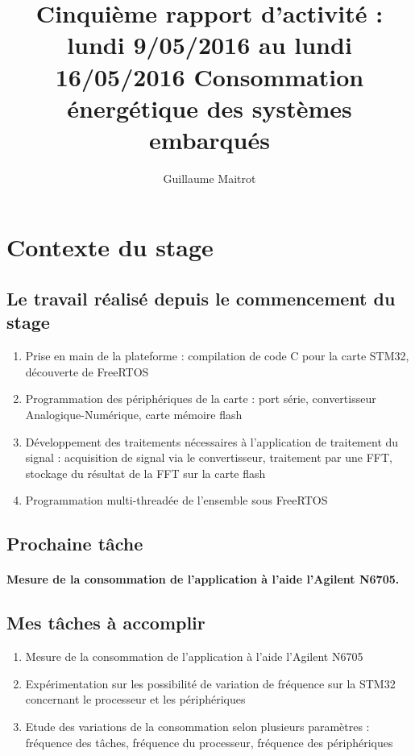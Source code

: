 \documentclass[a4paper]{article}
\title{Cinquième rapport d'activité : lundi 9/05/2016 au lundi 16/05/2016 }
\author{Guillaume Maitrot}
\begin{document}
\maketitle

\begin{center}
\centering
\title{Consommation énergétique des systèmes embarqués}
\end{center}

\section{Contexte du stage}

 \subsection{Le travail réalisé depuis le commencement du stage}
 \begin{enumerate}
\item {Prise en main de la plateforme : compilation de code C pour la carte STM32, découverte de FreeRTOS}
\item {Programmation des périphériques de la carte : port série,
convertisseur Analogique-Numérique, carte mémoire flash}
\item {Développement des traitements nécessaires à l'application de
traitement du signal : acquisition de signal via le convertisseur,
traitement par une FFT, stockage du résultat de la FFT sur la carte
flash}
\item { Programmation multi-threadée de l'ensemble sous FreeRTOS}
\end{enumerate}

 \subsection{Prochaine tâche}
    \paragraph{Mesure de la consommation de l'application à l'aide l'Agilent
N6705.}
    
\subsection{Mes tâches à accomplir}
\begin{enumerate}
\item {Mesure de la consommation de l'application à l'aide l'Agilent
N6705}
\item {Expérimentation sur les possibilité de variation de fréquence sur la
STM32 concernant le processeur et les périphériques}
\item {Etude des variations de la consommation selon plusieurs paramètres :
fréquence des tâches, fréquence du processeur, fréquence des
périphériques}
\end{enumerate}
\end{document}
